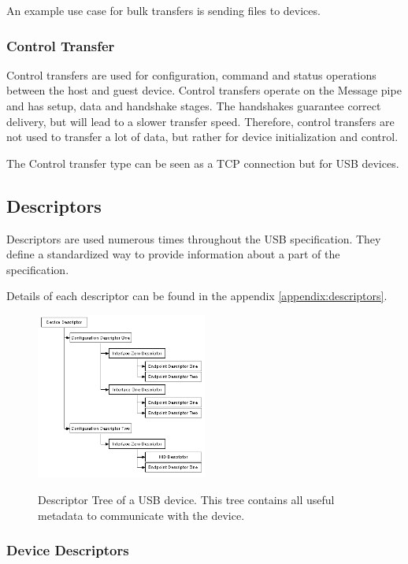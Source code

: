 An example use case for bulk transfers is sending files to devices.

\subsubsection{Control Transfer}
Control transfers are used for configuration, command and status operations between the host and guest device. Control transfers operate on the Message pipe and has setup, data and handshake stages. The handshakes guarantee correct delivery, but will lead to a slower transfer speed. Therefore, control transfers are not used to transfer a lot of data, but rather for device initialization and control.

The Control transfer type can be seen as a TCP connection but for USB devices.

\subsection{Descriptors}

Descriptors are used numerous times throughout the USB specification. They define a standardized way to provide information about a part of the specification.

Details of each descriptor can be found in the appendix \ref{appendix:descriptors}.

\begin{figure}[h]
  \centering
  \includegraphics[width=0.5\textwidth]{images/descriptor_tree.png}
  \caption{Descriptor Tree of a USB device. This tree contains all useful metadata to communicate with the device.}
  \label{fig:descriptor_tree}
  \cite{USB_in_a_NutShell}
\end{figure}

\subsubsection{Device Descriptors}

